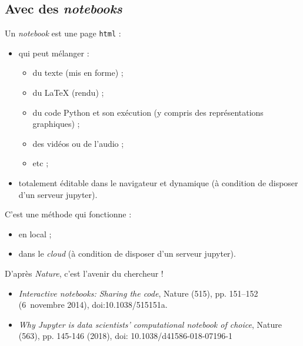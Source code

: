 \documentclass[10pt,aspectratio=169]{beamer}
\begin{document}
\subsection{Avec des \emph{notebooks}}

\begin{frame}
  \begin{Definition}
    Un \emph{notebook} est une page \texttt{html} :
    \begin{itemize}
    \item qui peut mélanger :
      \begin{itemize}
      \item du texte (mis en forme) ;
      \item du \LaTeX{} (rendu) ;
      \item du code Python et son exécution (y compris des représentations graphiques) ;
      \item des vidéos ou de l'audio ;
      \item etc ;
      \end{itemize}
    \item totalement éditable dans le navigateur et dynamique (à condition de disposer d'un serveur jupyter).
    \end{itemize}
  \end{Definition}
\end{frame}

\begin{frame}
  \begin{BonASavoir}
    C'est une méthode qui fonctionne :
    \begin{itemize}
    \item en \alert{local} ;
    \item dans le \alert{\emph{cloud}} (à condition de disposer d'un serveur jupyter).
    \end{itemize}
  \end{BonASavoir}
\end{frame}

\begin{frame}
  \begin{Conseil}
    D'après \emph{Nature}, c'est l'avenir du chercheur !
    \begin{itemize}
    \item \emph{Interactive notebooks: Sharing the code}, Nature (515), pp. 151–152 (6~novembre 2014), doi:10.1038/515151a.
    \item \emph{Why Jupyter is data scientists’ computational notebook of choice}, Nature (563), pp. 145-146 (2018), doi: 10.1038/d41586-018-07196-1
    \end{itemize}
  \end{Conseil}
\end{frame}
\end{document}

